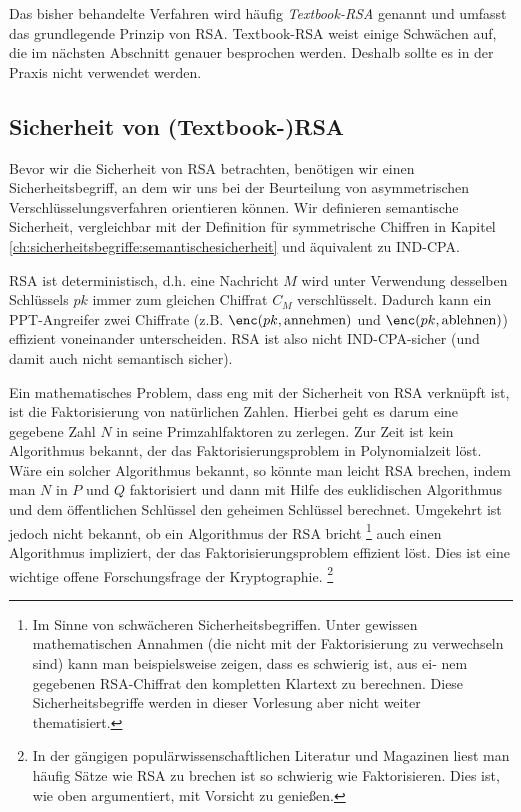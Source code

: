 Das bisher behandelte Verfahren wird häufig \textit{Textbook-RSA}
\indexRSATextBook genannt und umfasst das grundlegende Prinzip von
RSA. Textbook-RSA weist einige Schwächen auf, die im nächsten Abschnitt
genauer besprochen werden. Deshalb sollte es in der Praxis nicht
verwendet werden.

\subsection{Sicherheit von (Textbook-)RSA}
\label{ch:asymmenc:rsa:sicherheit} Bevor wir die Sicherheit von RSA
betrachten, benötigen wir einen Sicherheitsbegriff, an dem wir uns bei
der Beurteilung von asymmetrischen Verschlüsselungsverfahren orientieren
können. Wir definieren semantische Sicherheit, vergleichbar mit der
Definition für symmetrische Chiffren in Kapitel
\ref{ch:sicherheitsbegriffe:semantischesicherheit} und äquivalent zu
IND-CPA.

RSA ist deterministisch, d.h. eine Nachricht $M$ wird unter Verwendung
desselben Schlüssels $pk$ immer zum gleichen Chiffrat $C_M$
verschlüsselt. Dadurch kann ein PPT-Angreifer zwei Chiffrate
(z.B. $\enc(pk, \text{annehmen})$ und $\enc(pk, \text{ablehnen})$)
effizient voneinander unterscheiden. RSA ist also nicht IND-CPA-sicher
(und damit auch nicht semantisch sicher).

Ein mathematisches Problem, dass eng mit der Sicherheit von RSA
verknüpft ist, ist die Faktorisierung von natürlichen Zahlen. Hierbei
geht es darum eine gegebene Zahl $N$ in seine Primzahlfaktoren zu
zerlegen. Zur Zeit ist kein Algorithmus bekannt, der das
Faktorisierungsproblem in Polynomialzeit löst. Wäre ein solcher
Algorithmus bekannt, so könnte man leicht RSA \glqq brechen\grqq , indem
man $N$ in $P$ und $Q$ faktorisiert und dann mit Hilfe des euklidischen
Algorithmus und dem öffentlichen Schlüssel den geheimen Schlüssel
berechnet. Umgekehrt ist jedoch nicht bekannt, ob ein Algorithmus der
RSA bricht \footnote{Im Sinne von schwächeren
  Sicherheitsbegriffen. Unter gewissen mathematischen Annahmen (die nicht
  mit der Faktorisierung zu verwechseln sind) kann man beispielsweise
  zeigen, dass es schwierig ist, aus ei- nem gegebenen RSA-Chiffrat den
  kompletten Klartext zu berechnen. Diese Sicherheitsbegriffe werden in
  dieser Vorlesung aber nicht weiter thematisiert.} auch einen Algorithmus
impliziert, der das Faktorisierungsproblem effizient löst. Dies ist eine
wichtige offene Forschungsfrage der Kryptographie. \footnote{In der
  gängigen populärwissenschaftlichen Literatur und Magazinen liest man
  häufig Sätze wie \glqq RSA zu brechen ist so schwierig wie
  Faktorisieren\grqq. Dies ist, wie oben argumentiert, mit Vorsicht zu
  genießen.}

